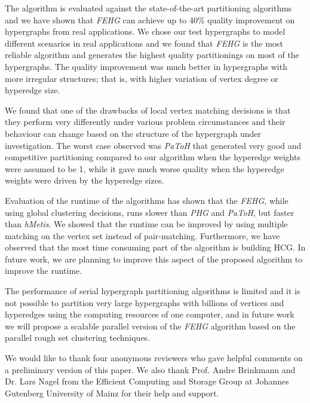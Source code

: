 \documentclass[twocolumn]{svjour3}          \smartqed
\begin{document}
The algorithm is evaluated against the state-of-the-art partitioning algorithms and we have shown that \textit{FEHG} can achieve up to 40\% quality improvement on hypergraphs from real applications. We chose our test hypergraphs to model different scenarios in real applications and we found that \textit{FEHG} is the most reliable algorithm and generates the highest quality partitionings on most of the hypergraphs. The quality improvement was much better in hypergraphs with more irregular structures; that is, with higher variation of vertex degree or hyperedge size.

We found that one of the drawbacks of local vertex matching decisions is that they perform very differently under various problem circumstances and their behaviour can change based on the structure of the hypergraph under investigation. The worst case observed was \textit{PaToH} that generated very good and competitive partitioning compared to our algorithm when the hyperedge weights were assumed to be 1, while it gave much worse quality when the hyperedge weights were driven by the hyperedge sizes.

Evaluation of the runtime of the algorithms has shown that the \textit{FEHG}, while using global clustering decisions, runs slower than \textit{PHG} and \textit{PaToH}, but faster than \textit{hMetis}. We showed that the runtime can be improved by using multiple matching on the vertex set instead of pair-matching. Furthermore, we have observed that the most time consuming part of the algorithm is building HCG. In future work, we are planning to improve this aspect of the proposed algorithm to improve the runtime. 

The performance of serial hypergraph partitioning algorithms is limited and it is not possible to partition very large hypergraphs with  billions of vertices and hyperedges using the computing resources of one computer, and in future work we will propose a scalable parallel version of the \textit{FEHG} algorithm based on the parallel rough set clustering techniques. 


\iffalse
\fi

\begin{acknowledgements}
We would like to thank four anonymous reviewers who gave helpful comments on a preliminary version of this paper. We also thank Prof. Andre Brinkmann and Dr. Lars Nagel from the Efficient Computing and Storage Group at Johannes Gutenberg University of Mainz for their help and support.
\end{acknowledgements}

      {}
\end{document}
